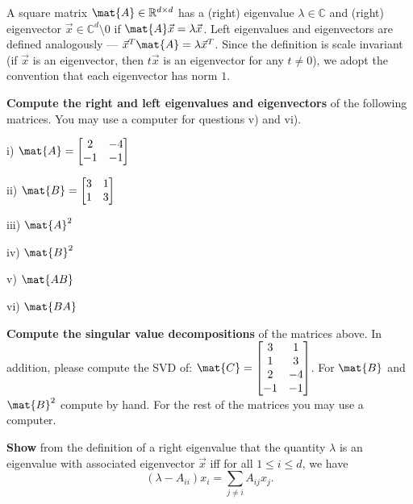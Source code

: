 \documentclass[preview]{standalone}
\begin{document}
A square matrix $\mat{A} \in \mathbb{R}^{d \times d}$ has a (right) eigenvalue $\lambda \in \mathbb{C}$
and (right) eigenvector $\vec{x} \in \mathbb{C}^{d} \setminus 0$ if $\mat{A}\vec{x} = \lambda \vec{x}$.
Left eigenvalues and eigenvectors are defined analogously --- $\vec{x}^T \mat{A} = \lambda \vec{x}^T$.
Since the definition is scale invariant
(if $\vec{x}$ is an eigenvector, then $t\vec{x}$ is an eigenvector for any $t \neq 0$),
we adopt the convention that each eigenvector has norm $1$.

\begin{Parts}

  \Part \textbf{Compute the right and left eigenvalues and
    eigenvectors} of the following matrices. You may use a computer
  for questions v) and vi).

i) $\mat{A} =
\begin{bmatrix}
2 & -4 \\
-1 & -1
\end{bmatrix}
$



ii) $\mat{B} =
\begin{bmatrix}
3 & 1 \\
1 & 3
\end{bmatrix}
$




iii) $\mat{A}^2$




iv) $\mat{B}^2$




v) $\mat{AB}$





vi) $\mat{BA}$




\Part \textbf{Compute the singular value decompositions} of the matrices
above. In addition, please compute the SVD of:
$\mat{C} =
\begin{bmatrix}
3 & 1 \\
1 & 3 \\
2 & -4 \\
-1 & -1
\end{bmatrix}
$. For $\mat{B}$ and $\mat{B}^2$ compute by hand. For the rest of the matrices you may
use a computer.




\Part \textbf{Show} from the definition of a right eigenvalue that the quantity
$\lambda$ is an eigenvalue with associated eigenvector $\vec{x}$ iff
for all $1 \leq i \leq d$, we have $$(\lambda - A_{ii}) x_i = \sum_{j
  \neq i} A_{ij} x_j.$$





\end{Parts}
\end{document}
